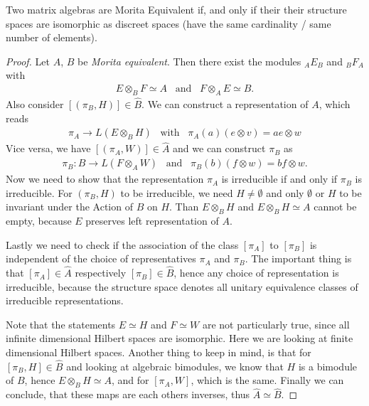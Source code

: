 \begin{mylemma}
    Two matrix algebras are Morita Equivalent if, and only if their their structure spaces
    are isomorphic as discreet spaces (have the same cardinality / same number
    of elements).
\end{mylemma}
\begin{proof}
    Let $A$, $B$ be \textit{Morita equivalent}. Then there exist the modules
    $_A E_B$ and $_B F_A$ with
    \begin{align}
        E \otimes _B F \simeq A \;\;\; \text{and} \;\;\; F \otimes _A E \simeq
        B.
    \end{align}
    Also consider $[(\pi _B, H)] \in \hat{B}$. We can construct a
    representation of $A$, which reads
    \begin{align}
        \pi _A \rightarrow L(E \otimes _B H)\;\;\; \text{with} \;\;\; \pi _A(a)
        (e \otimes v) = a e \otimes w
    \end{align}
    Vice versa, we have $[(\pi _A, W)] \in \hat{A}$ and we can construct $\pi _B$
    as
    \begin{align}
        \pi _B: B \rightarrow L(F \otimes _A W) \;\;\; \text{and}\;\;\; \pi
        _B(b) (f\otimes w) = bf\otimes w.
    \end{align}
    Now we need to show that the representation $\pi _A$ is irreducible if and
    only if $\pi _B$ is irreducible. For $(\pi _B, H)$ to be irreducible, we
    need $H \neq \emptyset$ and only $\emptyset$ or $H$ to be invariant under
    the Action of $B$ on $H$. Than $E\otimes _B H$ and $E\otimes _B H \simeq A$
    cannot be empty, because $E$ preserves left representation of $A$.

    Lastly we need to check if the association of the class $[\pi _A]$ to $[\pi
    _B]$ is independent of the choice of representatives $\pi _A$ and $\pi _B$.
    The important thing is that $[\pi _A] \in \hat{A}$ respectively $[\pi _B] \in
    \hat{B}$, hence any choice of representation is irreducible, because the
    structure space denotes all unitary equivalence classes of irreducible
    representations.

    Note that the statements $E \simeq H$ and $F \simeq W$ are not particularly
    true, since all infinite dimensional Hilbert spaces are isomorphic.  Here
    we are looking at finite dimensional Hilbert spaces. Another thing to keep
    in mind, is that for $[\pi _B, H] \in \hat{B}$ and looking at algebraic
    bimodules, we know that $H$ is a bimodule of $B$, hence $E \otimes _B
    H\simeq A$, and for $[\pi _A, W]$, which is the same.
    Finally we can conclude, that these maps are each others inverses, thus
    $\hat{A} \simeq \hat{B}$.
\end{proof}

